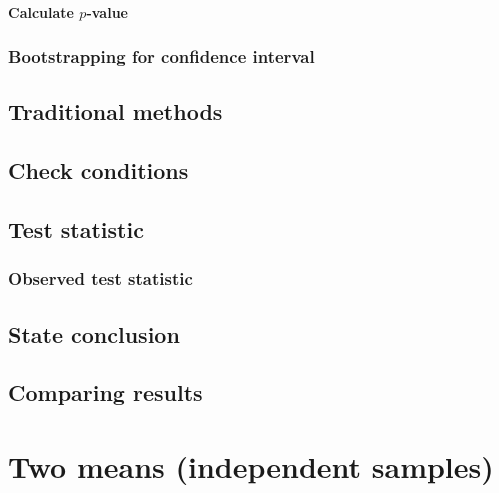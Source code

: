 \documentclass[
  12pt, krantz2,
]{krantz}
\begin{document}
\hypertarget{calculate-p-value-2}{%
\paragraph{\texorpdfstring{Calculate \(p\)-value}{Calculate p-value}}\label{calculate-p-value-2}}

\hypertarget{bootstrapping-for-confidence-interval-2}{%
\subsubsection*{Bootstrapping for confidence interval}\label{bootstrapping-for-confidence-interval-2}}


\hypertarget{traditional-methods-2}{%
\subsection{Traditional methods}\label{traditional-methods-2}}

\hypertarget{check-conditions-2}{%
\subsection{Check conditions}\label{check-conditions-2}}

\hypertarget{test-statistic-2}{%
\subsection{Test statistic}\label{test-statistic-2}}

\hypertarget{observed-test-statistic-2}{%
\subsubsection*{Observed test statistic}\label{observed-test-statistic-2}}


\hypertarget{state-conclusion-2}{%
\subsection{State conclusion}\label{state-conclusion-2}}

\hypertarget{comparing-results-2}{%
\subsection{Comparing results}\label{comparing-results-2}}

\hypertarget{two-means-independent-samples}{%
\section{Two means (independent samples)}\label{two-means-independent-samples}}
\end{document}
